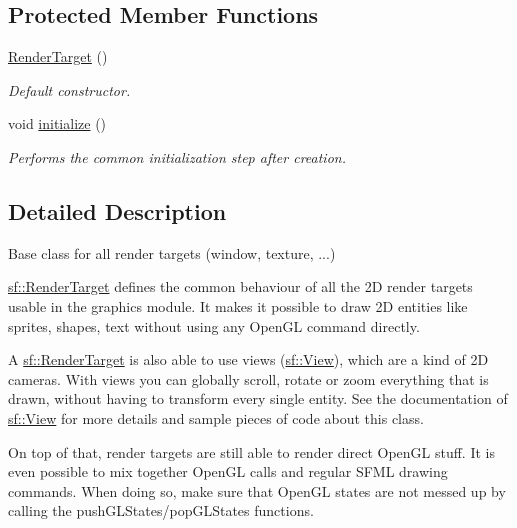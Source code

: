 \subsection*{Protected Member Functions}
\begin{DoxyCompactItemize}
\item 
\hypertarget{classsf_1_1RenderTarget_a2997c96cbd93cb8ce0aba2ddae35b86f}{\hyperlink{classsf_1_1RenderTarget_a2997c96cbd93cb8ce0aba2ddae35b86f}{Render\-Target} ()}\label{classsf_1_1RenderTarget_a2997c96cbd93cb8ce0aba2ddae35b86f}

\begin{DoxyCompactList}\small\item\em Default constructor. \end{DoxyCompactList}\item 
void \hyperlink{classsf_1_1RenderTarget_af530274b34159d644e509b4b4dc43eb7}{initialize} ()
\begin{DoxyCompactList}\small\item\em Performs the common initialization step after creation. \end{DoxyCompactList}\end{DoxyCompactItemize}


\subsection{Detailed Description}
Base class for all render targets (window, texture, ...) 

\hyperlink{classsf_1_1RenderTarget}{sf\-::\-Render\-Target} defines the common behaviour of all the 2\-D render targets usable in the graphics module. It makes it possible to draw 2\-D entities like sprites, shapes, text without using any Open\-G\-L command directly.

A \hyperlink{classsf_1_1RenderTarget}{sf\-::\-Render\-Target} is also able to use views (\hyperlink{classsf_1_1View}{sf\-::\-View}), which are a kind of 2\-D cameras. With views you can globally scroll, rotate or zoom everything that is drawn, without having to transform every single entity. See the documentation of \hyperlink{classsf_1_1View}{sf\-::\-View} for more details and sample pieces of code about this class.

On top of that, render targets are still able to render direct Open\-G\-L stuff. It is even possible to mix together Open\-G\-L calls and regular S\-F\-M\-L drawing commands. When doing so, make sure that Open\-G\-L states are not messed up by calling the push\-G\-L\-States/pop\-G\-L\-States functions.

